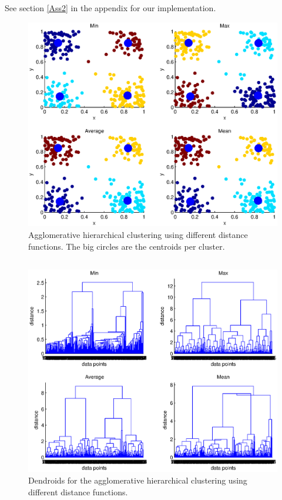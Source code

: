 \documentclass[10pt]{article}
\begin{document}
\subsection{}
See section \ref{Ass2} in the appendix for our implementation.
\begin{figure}
	\includegraphics[width=\columnwidth]{Ass2_1.eps}
	\caption{Agglomerative hierarchical clustering using different distance functions. The big circles are the centroids per cluster.}
	\label{fig2a}
\end{figure}
\nodindent 

\subsection{}
\begin{figure}
	\includegraphics[width=\columnwidth]{Ass2_2.eps}
	\caption{Dendroids for the agglomerative hierarchical clustering using different distance functions.}
	\label{fig2b}
\end{figure}
\end{document}
